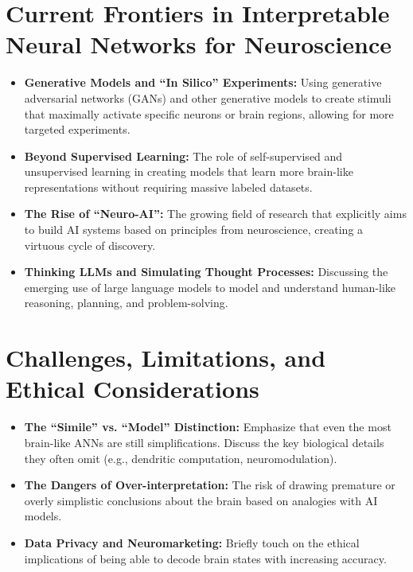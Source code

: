\documentclass[11pt,a4paper]{article}
\begin{document}
\section{Current Frontiers in Interpretable Neural Networks for Neuroscience}
\begin{itemize}
    \item \textbf{Generative Models and ``In Silico'' Experiments:} Using generative adversarial networks (GANs) and other generative models to create stimuli that maximally activate specific neurons or brain regions, allowing for more targeted experiments.
    \item \textbf{Beyond Supervised Learning:} The role of self-supervised and unsupervised learning in creating models that learn more brain-like representations without requiring massive labeled datasets.
    \item \textbf{The Rise of ``Neuro-AI'':} The growing field of research that explicitly aims to build AI systems based on principles from neuroscience, creating a virtuous cycle of discovery.
    \item \textbf{Thinking LLMs and Simulating Thought Processes:} Discussing the emerging use of large language models to model and understand human-like reasoning, planning, and problem-solving.
\end{itemize}

\section{Challenges, Limitations, and Ethical Considerations}
\begin{itemize}
    \item \textbf{The ``Simile'' vs. ``Model'' Distinction:} Emphasize that even the most brain-like ANNs are still simplifications. Discuss the key biological details they often omit (e.g., dendritic computation, neuromodulation).
    \item \textbf{The Dangers of Over-interpretation:} The risk of drawing premature or overly simplistic conclusions about the brain based on analogies with AI models.
    \item \textbf{Data Privacy and Neuromarketing:} Briefly touch on the ethical implications of being able to decode brain states with increasing accuracy.
\end{itemize}
\end{document}
